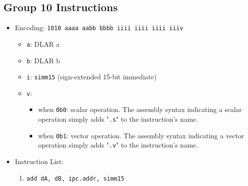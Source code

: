 \documentclass{article}
\begin{document}
	\subsection{Group 10 Instructions}
		\begin{itemize}
		\item Encoding: \texttt{1010 aaaa aabb bbbb  iiii iiii iiii iiiv}
			\begin{itemize}
			\item \texttt{a}: DLAR a
			\item \texttt{b}: DLAR b
			\item \texttt{i}: \texttt{simm15} (sign-extended 15-bit
				immediate)
			\item \texttt{v}:
				\begin{itemize}
				\item when \texttt{0b0}: scalar operation. The assembly
					syntax indicating a scalar operation simply adds
					"\texttt{.s}" to the instruction's name.
				\item when \texttt{0b1}: vector operation. The assembly
					syntax indicating a vector operation simply adds
					"\texttt{.v}" to the instruction's name.
				\end{itemize}
			\end{itemize}
		\item Instruction List:
			\begin{enumerate}
			\item \texttt{add dA, dB, ipc.addr, simm15}
			\end{enumerate}
		\end{itemize}

\end{document}
